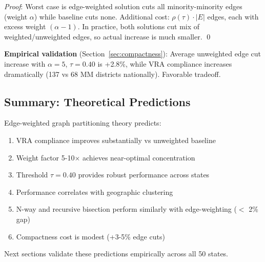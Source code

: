 \textit{Proof}: Worst case is edge-weighted solution cuts all minority-minority edges (weight $\alpha$) while baseline cuts none. Additional cost: $\rho(\tau) \cdot |E|$ edges, each with excess weight $(\alpha - 1)$. In practice, both solutions cut mix of weighted/unweighted edges, so actual increase is much smaller. \qed

\textbf{Empirical validation} (Section~\ref{sec:compactness}): Average unweighted edge cut increase with $\alpha = 5$, $\tau = 0.40$ is +2.8\%, while VRA compliance increases dramatically (137 vs 68 MM districts nationally). Favorable tradeoff.

\subsection{Summary: Theoretical Predictions}

Edge-weighted graph partitioning theory predicts:

\begin{enumerate}
\item VRA compliance improves substantially vs unweighted baseline
\item Weight factor 5-10$\times$ achieves near-optimal concentration
\item Threshold $\tau = 0.40$ provides robust performance across states
\item Performance correlates with geographic clustering
\item N-way and recursive bisection perform similarly with edge-weighting ($<$ 2\% gap)
\item Compactness cost is modest (+3-5\% edge cuts)
\end{enumerate}

Next sections validate these predictions empirically across all 50 states.
